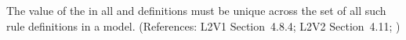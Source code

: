 The value of the   in all \AssignmentRule and
\RateRule definitions must be unique across the set of all such rule
definitions in a model.  (References: L2V1 Section~4.8.4; 
L2V2 Section~4.11; )

